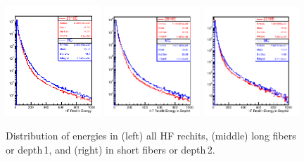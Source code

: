 \begin{figure}[h!]
\includegraphics[width=0.32\textwidth]{../Figures/Chap2/ImageFiles_HF/BasicPics/DataMC/HFEnergyDataMC}
\includegraphics[width=0.32\textwidth]{../Figures/Chap2/ImageFiles_HF/BasicPics/DataMC/ELDataMC}
\includegraphics[width=0.32\textwidth]{../Figures/Chap2/ImageFiles_HF/BasicPics/DataMC/ESDataMC}
\caption{Distribution of energies in (left) all HF rechits, (middle) long fibers or depth\,1, and (right) in short fibers or depth\,2.}
\label{fig:HFEnergyDataMC}
\end{figure}

